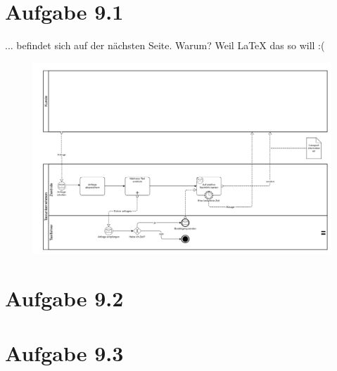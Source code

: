 \documentclass{article}
\begin{document}
	 
	 
	 \section*{Aufgabe 9.1}
	 ... befindet sich auf der nächsten Seite. Warum? Weil LaTeX das so will :(
	 	\begin{landscape}
	 		\begin{figure}[h!]
	 			\includegraphics[scale=0.14]{aufgabe_9_1.jpg}
	 		\end{figure}
	 	\end{landscape}
	
	
	\section*{Aufgabe 9.2}
	\pagebreak
	
	
	\section*{Aufgabe 9.3}
\end{document}

